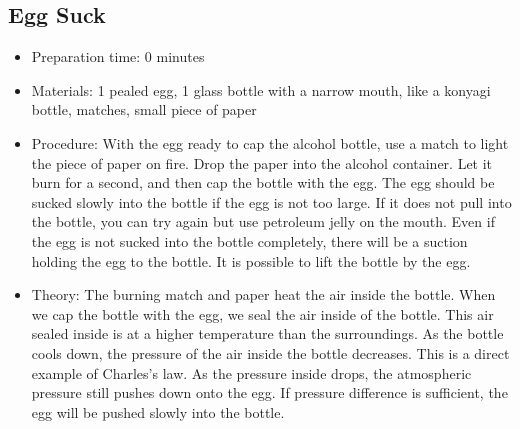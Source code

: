 
\subsection{Egg Suck}
\begin{itemize}
\item{Preparation time: 0 minutes}
\item{Materials: 1 pealed egg, 1 glass bottle with a narrow mouth, like a konyagi bottle, matches, small piece of paper}
\item{Procedure: With the egg ready to cap the alcohol bottle, use a match to light the piece of paper on fire. Drop the paper into the alcohol container. Let it burn for a second, and then cap the bottle with the egg. The egg should be sucked slowly into the bottle if the egg is not too large. If it does not pull into the bottle, you can try again but use petroleum jelly on the mouth. Even if the egg is not sucked into the bottle completely, there will be a suction holding the egg to the bottle. It is possible to lift the bottle by the egg.}
\item{Theory: The burning match and paper heat the air inside the bottle. When we cap the bottle with the egg, we seal the air inside of the bottle. This air sealed inside is at a higher temperature than the surroundings. As the bottle cools down, the pressure of the air inside the bottle decreases. This is a direct example of Charles's law. As the pressure inside drops, the atmospheric pressure still pushes down onto the egg. If pressure difference is sufficient, the egg will be pushed slowly into the bottle.}
\end{itemize}



